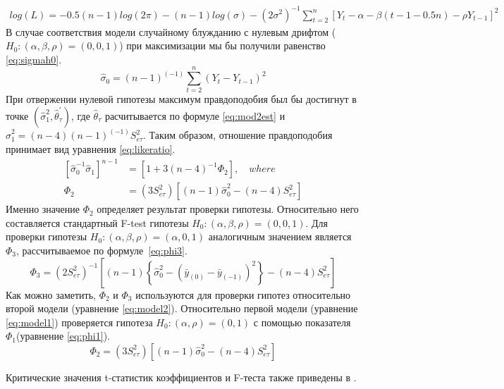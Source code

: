 \documentclass[a4paper,12pt]{article}
\begin{document}
\begin{align}
\label{eq:likefun}
log{(L)}=-0.5(n-1)log(2\pi)-(n-1)log{(\sigma)}-(2\sigma^2)^{-1}\sum_{t=2}^{n}
\left[Y_t-\alpha-\beta(t-1-0.5n)-\rho Y_{t-1}\right]^2
\end{align}
В случае соответствия модели случайному блужданию с нулевым дрифтом ($H_0:(\alpha,\beta,\rho)=(0,0,1)$) при максимизации мы бы получили равенство \ref{eq:sigmah0}.
\begin{equation}
  \label{eq:sigmah0}
  \hat{\sigma}_0=(n-1)^{(-1)}\sum_{t=2}^n(Y_t-Y_{t-1})^2
\end{equation}
При отвержении нулевой гипотезы максимум правдоподобия был бы достигнут в точке $(\hat{\sigma}_1^2,\hat{\theta}_\tau^{'})$, где $\hat{\theta}_\tau$ расчитывается по формуле \ref{eq:mod2est} и $\hat{\sigma}_1^2=(n-4)(n-1)^{(-1)}S^2_{e\tau}$. Таким образом, отношение правдоподобия принимает вид уравнения \ref{eq:likeratio}.
\begin{align}
  \label{eq:likeratio}
  \left[\hat{\sigma}_0^{-1}\hat{\sigma}_1\right]^{n-1}&=\left[1+3(n-4)^{-1}\Phi_2\right],\quad where\\
  \Phi_2&=(3S^2_{e\tau})\left[(n-1)\hat{\sigma}_0^2-(n-4)S^2_{e\tau}\right]
\end{align}
Именно значение $\Phi_2$ определяет результат проверки гипотезы. Относительно него составляется стандартный F-test гипотезы $H_0:(\alpha,\beta,\rho)=(0,0,1)$. Для проверки гипотезы $H_0:(\alpha,\beta,\rho)=(\alpha,0,1)$ аналогичным значением является~$\Phi_3$, рассчитываемое по формуле~\ref{eq:phi3}.
\begin{equation}
  \label{eq:phi3}
  \Phi_3=(2S_{e\tau}^2)^{-1}
  \left[
    (n-1)
      \left\{
        \hat{\sigma}_0^2-(\bar{y}_{(0)}-\bar{y}_{(-1)})^2
      \right\}
      -(n-4)S^2_{e\tau}
  \right]
\end{equation}
Как можно заметить, $\Phi_2$ и $\Phi_3$ используются для проверки гипотез относительно второй модели (уравнение \ref{eq:model2}). Относительно первой модели (уравнение \ref{eq:model1}) проверяется гипотеза $H_0:(\alpha,\rho)=(0,1)$ с помощью показателя $\Phi_1$(уравнение \ref{eq:phi1}).
\begin{equation}
  \label{eq:phi1}
  \Phi_2=(3S^2_{e\tau})\left[(n-1)\hat{\sigma}_0^2-(n-4)S^2_{e\tau}\right]
\end{equation}

Критические значения t-статистик коэффициентов и F-теста также приведены в \cite{Dickey1981}.

\newpage
\end{document}
